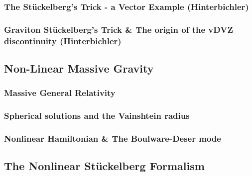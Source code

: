 \documentclass{book}
\theoremstyle{definition}
\begin{document}
\subsubsection{The St\"{u}ckelberg's Trick - a Vector Example (Hinterbichler)}

















\subsubsection{Graviton St\"{u}ckelberg's Trick \& The origin of the vDVZ discontinuity (Hinterbichler)}





















\newpage


\subsection{Non-Linear Massive Gravity}

\subsubsection{Massive General Relativity}
\subsubsection{Spherical solutions and the Vainshtein radius}
\subsubsection{Nonlinear Hamiltonian \& The Boulware-Deser mode}












\newpage


\subsection{The Nonlinear St\"{u}ckelberg Formalism}
\end{document}
